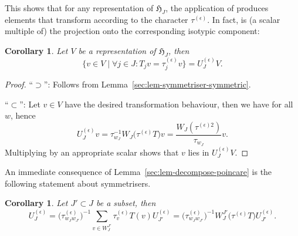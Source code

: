 \documentclass[10pt,a4paper]{amsart}
\newtheorem{Corollary}[Theorem]{Corollary}
\theoremstyle{definition}
\numberwithin{equation}{section}
\begin{document}
This shows that for any representation of $\mathfrak{H}_J$, the application of 
produces elements that transform according to the character $\tau^{(\epsilon)}$. In fact, 
is (a scalar multiple of) the projection onto the corresponding isotypic component:
\begin{Corollary}\label{sec:cor-makes-symmetric}
 Let $V$ be a representation of $\mathfrak{H}_J$, then
 \[
 \big\{v\in V\mid \forall j\in J\colon T_j v = \tau^{(\epsilon)}_j v\big\}
 = U^{(\epsilon)}_J V.
 \]
\end{Corollary}
\begin{proof}
``$\supset$'': Follows from Lemma~\ref{sec:lem-symmetriser-symmetric}.

``$\subset$'': Let $v\in V$ have the desired transformation behaviour, then we have  for all $w$, hence
 \[
 U^{(\epsilon)}_J v
 = \tau_{w_J}^{-1} W_J\bigl(\tau^{(\epsilon)}T\bigr) v
 = \frac{W_J(\tau^{(\epsilon)2})}{\tau_{w_J}}v.
 \]
 Multiplying by an appropriate scalar shows that $v$ lies
 in $U^{(\epsilon)}_JV.$
\end{proof}

An immediate consequence of Lemma~\ref{sec:lem-decompose-poincare} is
the following statement about symmetrisers.

\begin{Corollary}\label{sec:lem-decomposition-symmetriser}
 Let $J'\subset J$ be a subset, then
 \[
 U^{(\epsilon)}_J = \bigl(\tau^{(\epsilon)}_{w_Jw_{J'}}\bigr)^{-1}\sum_{v\in W_J^{J'}} \tau^{(\epsilon)}_v
 T(v) U^{(\epsilon)}_{J'}
 = \bigl(\tau^{(\epsilon)}_{w_Jw_{J'}}\bigr)^{-1} W_J^{J'}\bigl(\tau^{(\epsilon)}T\bigr)
 U^{(\epsilon)}_{J'}.
 \]
\end{Corollary}
\end{document}
